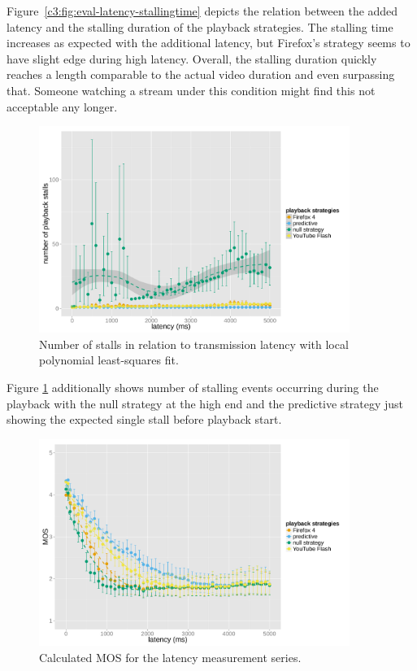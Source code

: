 Figure~\ref{c3:fig:eval-latency-stallingtime} depicts the relation between the added latency and the stalling duration of the playback strategies. The stalling time increases as expected with the additional latency, but Firefox's strategy seems to have slight edge during high latency. Overall, the stalling duration quickly reaches a length comparable to the actual video duration and even surpassing that. Someone watching a stream under this condition might find this not acceptable any longer.

\begin{figure}[htb]
	\centering
	\includegraphics[width=0.9\textwidth]{images/R-playbackemulation-stallnumber-latency.pdf}
	\caption{Number of stalls in relation to transmission latency with local polynomial least-squares fit.}
\label{c3:fig:eval-latency-numstalls}
\end{figure}

Figure \ref{c3:fig:eval-latency-numstalls} additionally shows number of stalling events occurring during the playback with the null strategy at the high end and the predictive strategy just showing the expected single stall before playback start.

\begin{figure}[htb]
	\centering
	\includegraphics[width=0.9\textwidth]{images/R-playbackemulation-qoe-latency.pdf}
	\caption{Calculated \acrshort{MOS} for the latency measurement series.}
\label{c3:fig:eval-latency-qoe}
\end{figure}

